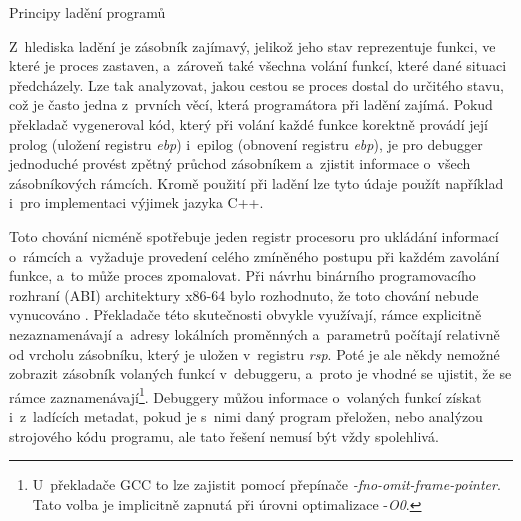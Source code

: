 \documentclass[czech,bachelor,male,python,dept460,hidelinks]{diploma}						%
\newcommand{\parspace}[1][]{
	\ifthenelse{\isempty{#1}}{\vspace{0mm}}{\vspace{#1}}
	\par
}
\begin{document}
\begin{section}{Principy ladění programů}
		
		\parspace Z~hlediska ladění je zásobník zajímavý, jelikož jeho stav reprezentuje funkci, ve které je proces zastaven, a~zároveň také všechna volání
		funkcí, které dané situaci předcházely. Lze tak analyzovat, jakou cestou se proces dostal do určitého stavu, což je často jedna z~prvních věcí, která
		programátora při ladění zajímá. Pokud překladač vygeneroval kód, který při volání každé funkce korektně provádí její prolog (uložení registru \textit{ebp})
		i~epilog (obnovení registru \textit{ebp}), je pro debugger jednoduché provést zpětný průchod zásobníkem a~zjistit informace o~všech zásobníkových rámcích.
		Kromě použití při ladění lze tyto údaje použít například i~pro implementaci výjimek jazyka C++.
		
		\parspace Toto chování nicméně spotřebuje jeden registr procesoru pro ukládání informací o~rámcích a~vyžaduje provedení celého zmíněného postupu při každém
		zavolání funkce, a~to může proces zpomalovat. Při návrhu binárního programovacího rozhraní (ABI) architektury x86-64 bylo rozhodnuto, že toto chování nebude
		vynucováno \cite[16]{x64abi}. Překladače této skutečnosti obvykle využívají, rámce explicitně nezaznamenávají a~adresy
		lokálních proměnných a~parametrů počítají relativně od vrcholu zásobníku, který je uložen v~registru \textit{rsp}.
		Poté je ale někdy nemožné zobrazit zásobník volaných funkcí v~debuggeru, a~proto je vhodné se ujistit,
		že se rámce zaznamenávají\footnote{U~překladače GCC to lze zajistit pomocí přepínače \textit{-fno-omit-frame-pointer}.
		Tato volba je implicitně zapnutá při úrovni optimalizace -\textit{O0}. }.
		Debuggery můžou informace o~volaných funkcí získat i~z~ladících metadat, pokud je s~nimi daný program přeložen,
		nebo analýzou strojového kódu programu, ale tato řešení nemusí být vždy spolehlivá.
\end{section}
\end{document}

